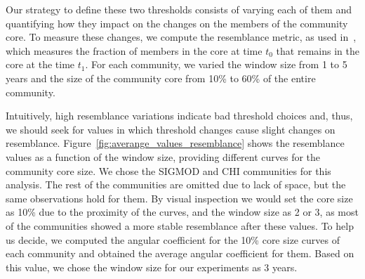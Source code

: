 Our strategy to define these two thresholds consists of varying each of them and quantifying how they impact on the changes on the members of the community core. To measure these
changes, we compute the resemblance metric, as used in~\cite{Viswanath:2009}, which measures the fraction of members in the core at time $t_0$ that remains in the core at the
time $t_1$. For each community, we varied the window size from 1 to 5 years and the size of the community core from 10\% to 60\% of the entire community.

Intuitively, high resemblance variations indicate bad threshold choices and, thus, we should seek for values in which threshold changes cause slight changes on resemblance.
Figure~\ref{fig:averange_values_resemblance} shows the resemblance values as a function of the window size, providing different curves for the community core size.  We chose the
SIGMOD and CHI communities for this analysis. The rest of the communities are omitted due to lack of space, but the same observations hold for them. By visual inspection we would set the core
size as 10\% due to the proximity of the curves, and the window size as 2 or 3, as most of the communities showed a more stable resemblance after these values. To help us decide, we
computed the angular coefficient for the 10\% core size curves of each community and obtained the average angular coefficient for them.  Based on this value, we chose the window
size for our experiments as 3 years.

